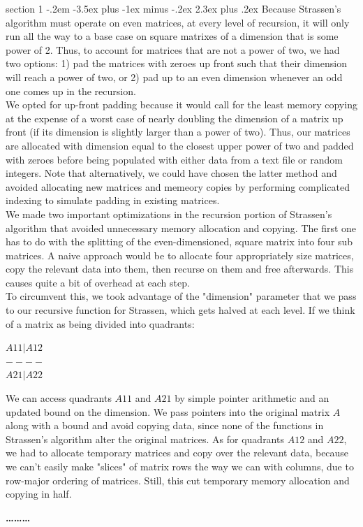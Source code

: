 \documentclass[12pt]{article}
\makeatletter
\newenvironment{problem}{\@startsection
       {section}
       {1}
       {-.2em}
       {-3.5ex plus -1ex minus -.2ex}
       {2.3ex plus .2ex}
       {\pagebreak[3]%
       \large\bf\noindent{Problem }
       }
       }
       {%
       \begin{center}\large\bf \ldots\ldots\ldots\end{center}}
\makeatother
\begin{document}
\begin{problem}{}
\noindent Because Strassen's algorithm must operate on even matrices, at every level of recursion, it will only run all the way to a base case on square matrixes of a dimension that is some power of 2.  Thus, to account for matrices that are not a power of two, we had two options: 1) pad the matrices with zeroes up front such that their dimension will reach a power of two, or 2) pad up to an even dimension whenever an odd one comes up in the recursion.  \\

\noindent We opted for up-front padding because it would call for the
least memory copying at the expense of a worst case of nearly doubling
the dimension of a matrix up front (if its dimension is slightly
larger than a power of two).  Thus, our matrices are allocated with
dimension equal to the closest upper power of two and padded with
zeroes before being populated with either data from a text file or
random integers. Note that alternatively, we could have chosen the
latter method and avoided allocating new matrices and memeory copies
by performing complicated indexing to simulate padding in existing matrices.\\

\noindent We made two important optimizations in the recursion portion of Strassen's algorithm that avoided unnecessary memory allocation and copying.  The first one has to do with the splitting of the even-dimensioned, square matrix into four sub matrices.  A naive approach would be to allocate four appropriately size matrices, copy the relevant data into them, then recurse on them and free afterwards.  This causes quite a bit of  overhead at each step.\\

\noindent To circumvent this, we took advantage of the "dimension" parameter that we pass to our recursive function for Strassen, which gets halved at each level.  If we think of a matrix as being divided into quadrants:
\begin{center}
$A11 | A12$\\
$----$\\
$A21 | A22$
\end{center}
\noindent We can access quadrants $A11$ and $A21$ by simple pointer arithmetic and an updated bound on the dimension.  We pass pointers into the original matrix $A$ along with a bound and avoid copying data, since none of the functions in Strassen's algorithm alter the original matrices.  As for quadrants $A12$ and $A22$, we had to allocate temporary matrices and copy over the relevant data, because we can't easily make "slices" of matrix rows the way we can with columns, due to row-major ordering of matrices.   Still, this cut temporary memory allocation and copying in half.\\


\end{problem}
\end{document}
